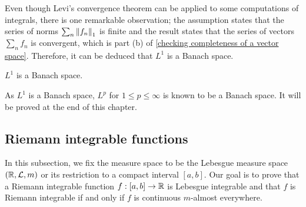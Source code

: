 Even though Levi's convergence theorem can be applied to some computations of integrals, there is one remarkable observation; the assumption states that the series of norms $\sum_n {\left\lVert{f_n}\right\rVert}_1$ is finite and the result states that the series of vectors $\sum_n f_n$ is convergent, which is part (b) of \cref{checking completeness of a vector space}.
Therefore, it can be deduced that $L^1$ is a Banach space.
\begin{thm}
    $L^1$ is a Banach space.
\end{thm}
As $L^1$ is a Banach space, $L^p$ for $1\leq p\leq \infty$ is known to be a Banach space.
It will be proved at the end of this chapter.

\subsection{Riemann integrable functions}
In this subsection, we fix the measure space to be the Lebesgue measure space $({\mathbb{R}}, {\mathcal{L}}, m)$ or its restriction to a compact interval $[a, b]$.
Our goal is to prove that a Riemann integrable function $f: [a, b]\rightarrow{\mathbb{R}}$ is Lebesgue integrable and that $f$ is Riemann integrable if and only if $f$ is continuous $m$-almost everywhere.

